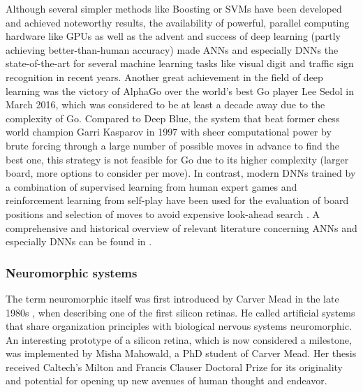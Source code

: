 Although several simpler methods like Boosting \cite{Freund1997} or \acp{SVM} \cite{Vapnik1995} have been developed and achieved noteworthy results, the availability of powerful, parallel computing hardware like \acp{GPU} as well as the advent and success  of deep learning (partly achieving better-than-human accuracy) made \acp{ANN} \cite{Rojas1996} and especially \acp{DNN} \cite{LeCun2015} the state-of-the-art for several machine learning tasks like visual digit \cite{Ciresan2012a} and traffic sign \cite{Ciresan2012} recognition in recent years.
Another great achievement in the field of deep learning was the victory of AlphaGo \cite{Silver2016} over the world's best Go player Lee Sedol in March 2016, which was considered to be at least a decade away due to the complexity of Go.
Compared to Deep Blue, the system that beat former chess world champion Garri Kasparov in 1997 \cite{Hsu2002} with sheer computational power by brute forcing through a large number of possible moves in advance to find the best one, this strategy is not feasible for Go due to its higher complexity (larger board, more options to consider per move).
In contrast, modern \acp{DNN} trained by a combination of supervised learning from human expert games and reinforcement learning from self-play have been used for the evaluation of board positions and selection of moves to avoid expensive look-ahead search \cite{Silver2016}.
A comprehensive and historical overview of relevant literature concerning \acp{ANN} and especially \acp{DNN} can be found in \cite{Schmidhuber2015, LeCun2015}.

\subsubsection{Neuromorphic systems}

The term neuromorphic itself was first introduced by Carver Mead in the late 1980s \cite{Mead90}, when describing one of the first silicon retinas.
He called artificial systems that share organization principles with biological nervous systems neuromorphic.
An interesting prototype of a silicon retina, which is now considered a milestone, was implemented by Misha Mahowald, a PhD student of Carver Mead.
Her thesis received Caltech's Milton and Francis Clauser Doctoral Prize for its originality and potential for opening up new avenues of human thought and endeavor.

